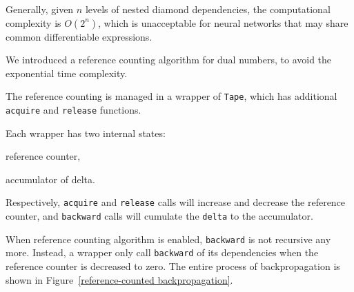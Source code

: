 Generally, given $n$ levels of nested diamond dependencies, the computational complexity is $O(2^n)$, which is unacceptable for neural networks that may share common \glspl{differentiable expression}.

We introduced a reference counting algorithm for dual numbers, to avoid the exponential time complexity.

The reference counting is managed in a wrapper of \lstinline{Tape}, which has additional \lstinline{acquire} and \lstinline{release} functions.

Each wrapper has two internal states:
\begin{enumerate*}
  \item reference counter,
  \item accumulator of delta.
\end{enumerate*}
Respectively, \lstinline{acquire} and \lstinline{release} calls will increase and decrease the reference counter, and \lstinline{backward} calls will cumulate the \lstinline{delta} to the accumulator.

When reference counting algorithm is enabled, \lstinline{backward} is not recursive any more. Instead, a wrapper only call \lstinline{backward} of its dependencies when the reference counter is decreased to zero. The entire process of backpropagation is shown in Figure~\ref{reference-counted backpropagation}.

